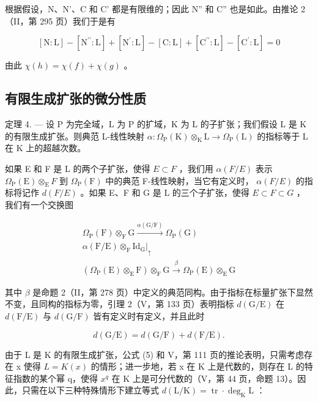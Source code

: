 根据假设，N、N'、C 和 C' 都是有限维的；因此 N'' 和 C'' 也是如此。由推论 2（II，第 295 页）我们于是有

\[
[ \mathrm{N}: \mathrm{L} ] - [ \mathrm{N} ^ {\prime \prime}: \mathrm{L} ] + [ \mathrm{N} ^ {\prime}: \mathrm{L} ] - [ \mathrm{C}: \mathrm{L} ] + [ \mathrm{C} ^ {\prime \prime}: \mathrm{L} ] - [ \mathrm{C} ^ {\prime}: \mathrm{L} ] = 0
\]

由此 \(\chi(h) = \chi(f) + \chi(g)\) 。

\subsection{有限生成扩张的微分性质}

定理 4. --- 设 P 为完全域，L 为 P 的扩域，K 为 L 的子扩张；我们假设 L 是 K 的有限生成扩张。则典范 L-线性映射 \(\alpha: \Omega_{\mathrm{P}}(\mathrm{K}) \otimes_{\mathrm{K}} \mathrm{L} \to \Omega_{\mathrm{P}}(\mathrm{L})\) 的指标等于 L 在 K 上的超越次数。

如果 E 和 F 是 L 的两个子扩张，使得 \(E \subset F\) ，我们用 \(\alpha(F/E)\) 表示 \(\Omega_{\mathrm{P}}(\mathrm{E}) \otimes_{\mathrm{E}} F\) 到 \(\Omega_{\mathrm{P}}(\mathrm{F})\) 中的典范 F-线性映射，当它有定义时， \(\alpha(F/E)\) 的指标将记作 \(d(F/E)\) 。如果 E、F 和 G 是 L 的三个子扩张，使得 \(E \subset F \subset G\) ，我们有一个交换图

\[
\begin{array}{c} \Omega_ {\mathrm{P}} (\mathrm{F}) \otimes_ {\mathrm{F}} \mathrm{G} \xrightarrow {\alpha (\mathrm{G} / \mathrm{F})} \Omega_ {\mathrm{P}} (\mathrm{G}) \\ \alpha (\mathrm{F} / \mathrm{E}) \otimes_ {\mathrm{F}} \mathrm{Id} _ {\mathrm{G}} \Bigg | _ {\uparrow} \\ (\Omega_ {\mathrm{P}} (\mathrm{E}) \otimes_ {\mathrm{E}} \mathrm{F}) \otimes_ {\mathrm{F}} \mathrm{G} \xrightarrow {\beta} \Omega_ {\mathrm{P}} (\mathrm{E}) \otimes_ {\mathrm{E}} \mathrm{G} \end{array}
\]

其中 \(\beta\) 是命题 2（II，第 278 页）中定义的典范同构。由于指标在标量扩张下显然不变，且同构的指标为零，引理 2（V，第 133 页）表明指标 \(d(\mathrm{G}/\mathrm{E})\) 在 \(d(\mathrm{F}/\mathrm{E})\) 与 \(d(\mathrm{G}/\mathrm{F})\) 皆有定义时有定义，并且此时

\[
d (\mathrm{G} / \mathrm{E}) = d (\mathrm{G} / \mathrm{F}) + d (\mathrm{F} / \mathrm{E}).\tag{5}
\]

由于 L 是 K 的有限生成扩张，公式 (5) 和 V，第 111 页的推论表明，只需考虑存在 x 使得 \(L = K(x)\) 的情形；进一步地，若 x 在 K 上是代数的，则存在 L 的特征指数的某个幂 q，使得 \(x^{q}\) 在 K 上是可分代数的（V，第 44 页，命题 13）。因此，只需在以下三种特殊情形下建立等式 \(d(\mathrm{L}/\mathrm{K}) = \operatorname{tr} \cdot \deg_{\mathrm{K}} \mathrm{L}\) ：

